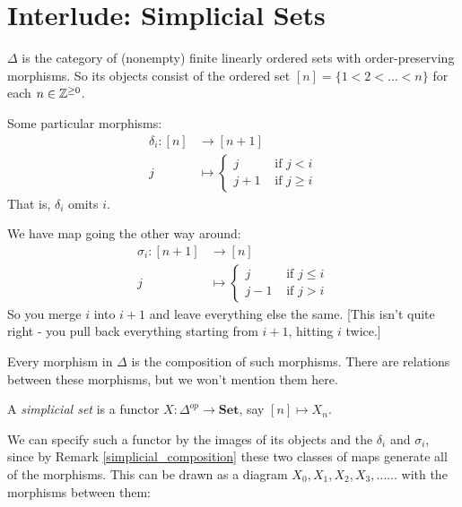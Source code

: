 \documentclass[../MH_Total.tex]{subfiles}
\begin{document}
\section{Interlude: Simplicial Sets}
\begin{definition}
	$\Delta$ is the category of (nonempty) finite linearly ordered sets with order-preserving morphisms. So its objects consist of the ordered set $[n] = \{1 < 2 < \dots < n\}$ for each $n \in \mathbb{Z}^{\ge 0}$.
\end{definition}

\begin{example}
	Some particular morphisms:
	\begin{align*}
		\delta_i: [n] &\to [n+1]\\
		j &\mapsto
		\begin{cases}
			j & \text{ if } j < i\\
			j+1 & \text{ if } j \ge i
		\end{cases}
	\end{align*}
	That is, $\delta_i$ omits $i$.

	We have map going the other way around:
	\begin{align*}
		\sigma_i: [n+1] &\to [n]\\
		j &\mapsto
		\begin{cases}
			j &\text{ if } j \le i\\
			j-1 &\text{ if } j > i
		\end{cases}
	\end{align*}
	So you merge $i$ into $i+1$ and leave everything else the same. [This isn't quite right - you pull back everything starting from $i+1$, hitting $i$ twice.]
\end{example}

\begin{remark}\label{simplicial_composition}
Every morphism in $\Delta$ is the composition of such morphisms.
There are relations between these morphisms, but we won't mention them here. 
\end{remark}

\begin{definition}
	A \emph{simplicial set} is a functor $X: \Delta^{op} \to \mathbf{Set}$, say $[n] \mapsto X_n$. 
\end{definition}

We can specify such a functor by the images of its objects and the $\delta_i$ and $\sigma_i$, since by Remark \ref{simplicial_composition} these two classes of maps generate all of the morphisms. This can be drawn as a diagram $X_0, X_1,X_2,X_3,\dots...$ with the morphisms between them:
\begin{center}
\end{center}
\end{document}
